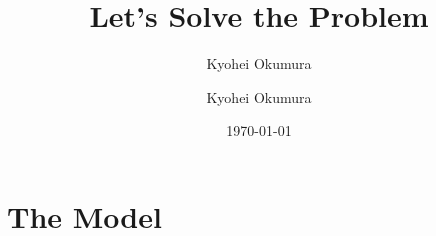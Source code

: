 \documentclass[11pt,a4paper]{article}
\author{Kyohei Okumura}
\begin{document}
\title{Let's Solve the Problem}
\author{Kyohei Okumura}
\date{\today}
\maketitle

\section{The Model}
\end{document}
